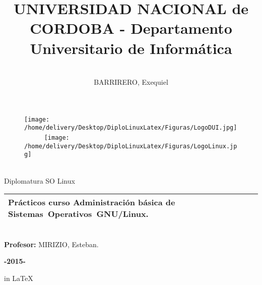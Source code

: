 \documentclass[a4paper,11pt,spanish]{article} %
\title{\huge UNIVERSIDAD NACIONAL de CORDOBA - Departamento Universitario de Informática}
\date{}
\begin{document}
\maketitle
\thispagestyle{empty}

\begin{figure}[htb] %
\centering
\texttt{[image: /home/delivery/Desktop/DiploLinuxLatex/Figuras/LogoDUI.jpg]} \ \ \
\ \
\texttt{[image: /home/delivery/Desktop/DiploLinuxLatex/Figuras/LogoLinux.jpg]}
\end{figure}

\begin{center}

\hspace*{\fill} \\[.7cm] \Large Diplomatura SO Linux
\\[1cm]

\begin{tabular}[h]{|p{ 9cm }|}
\hline 
\textbf{\Large Prácticos curso Administración básica de 
\mbox{Sistemas Operativos GNU/Linux.}}
\\
\hline
\end{tabular}

\author{ \hspace*{\fill} \\[.9cm] BARRIRERO, Exequiel \\}

\end{center}

\begin{flushleft}
\textbf{ \\[.3cm] Profesor:} MIRIZIO, Esteban.\\
\end{flushleft}

\begin{center}
\textbf{\large -2015-}\\[2.5cm]
\end{center}

\begin{center}
in \LaTeX
\end{center}

\newpage
\begin{center}
\tableofcontents
\listoffigures
\listoftables
\setcounter{secnumdepth}{3}
\end{center}
\end{document}
